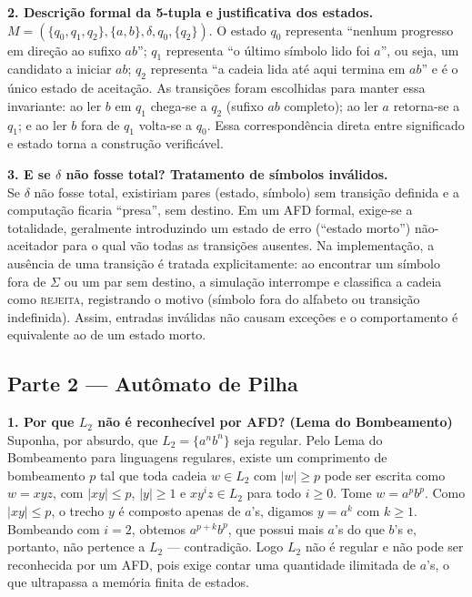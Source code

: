 \documentclass[12pt,a4paper]{article}
\begin{document}
\noindent\textbf{2. Descrição formal da 5-tupla e justificativa dos estados.}\\
$M = (\{q_0,q_1,q_2\}, \{a,b\}, \delta, q_0, \{q_2\})$. O estado $q_0$ representa
``nenhum progresso em direção ao sufixo $ab$''; $q_1$ representa ``o último símbolo
lido foi $a$'', ou seja, um candidato a iniciar $ab$; $q_2$ representa ``a cadeia
lida até aqui termina em $ab$'' e é o único estado de aceitação. As transições
foram escolhidas para manter essa invariante: ao ler $b$ em $q_1$ chega-se a $q_2$
(sufixo $ab$ completo); ao ler $a$ retorna-se a $q_1$; e ao ler $b$ fora de $q_1$
volta-se a $q_0$. Essa correspondência direta entre significado e estado torna a
construção verificável.

\noindent\textbf{3. E se $\delta$ não fosse total? Tratamento de símbolos inválidos.}\\
Se $\delta$ não fosse total, existiriam pares (estado, símbolo) sem transição
definida e a computação ficaria ``presa'', sem destino. Em um AFD formal, exige-se
a totalidade, geralmente introduzindo um estado de erro (``estado morto'')
não-aceitador para o qual vão todas as transições ausentes. Na implementação, a
ausência de uma transição é tratada explicitamente: ao encontrar um símbolo fora
de $\Sigma$ ou um par sem destino, a simulação interrompe e classifica a cadeia
como \textsc{rejeita}, registrando o motivo (símbolo fora do alfabeto ou transição
indefinida). Assim, entradas inválidas não causam exceções e o comportamento é
equivalente ao de um estado morto.

\subsection{Parte 2 --- Autômato de Pilha}
\textbf{1. Por que $L_2$ não é reconhecível por AFD? (Lema do Bombeamento)}\\
Suponha, por absurdo, que $L_2 = \{a^n b^n\}$ seja regular. Pelo Lema do
Bombeamento para linguagens regulares, existe um comprimento de bombeamento $p$
tal que toda cadeia $w \in L_2$ com $|w| \geq p$ pode ser escrita como $w = xyz$,
com $|xy| \leq p$, $|y| \geq 1$ e $xy^iz \in L_2$ para todo $i \geq 0$. Tome
$w = a^p b^p$. Como $|xy| \leq p$, o trecho $y$ é composto apenas de $a$'s, digamos
$y = a^k$ com $k \geq 1$. Bombeando com $i = 2$, obtemos $a^{p+k} b^p$, que possui
mais $a$'s do que $b$'s e, portanto, não pertence a $L_2$ --- contradição. Logo
$L_2$ não é regular e não pode ser reconhecida por um AFD, pois exige contar uma
quantidade ilimitada de $a$'s, o que ultrapassa a memória finita de estados.
\end{document}
